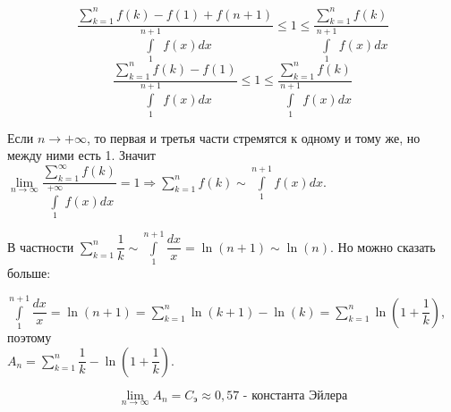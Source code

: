 \documentclass[../main.tex]{subfiles}
\begin{document}
\begin{example}
    \[\dfrac{ \sum\limits_{k=1}^{n}f\left(k\right)-f\left(1\right)+f\left(n+1\right)}{ \displaystyle\int\limits_{ 1}^{ n+1} f\left( x\right)dx} \leq 1 \leq \dfrac{ \sum\limits_{k=1}^{n}f\left(k\right)}{ \displaystyle\int\limits_{ 1}^{ n+1} f\left( x\right)dx} \]
    \[\dfrac{ \sum\limits_{k=1}^{n}f\left(k\right)-f\left(1\right)}{ \displaystyle\int\limits_{ 1}^{ n+1} f\left( x\right)dx} \leq 1 \leq \dfrac{ \sum\limits_{k=1}^{n}f\left(k\right)}{ \displaystyle\int\limits_{ 1}^{ n+1} f\left( x\right)dx} \]
  

    Если \( n \longrightarrow + \infty \), то первая и третья части стремятся к одному и тому же, но между ними есть 1. Значит \( \lim\limits_{ n \rightarrow \infty } \dfrac{ \sum\limits_{k=1}^{\infty}f\left(k\right)}{ \displaystyle\int\limits_{ 1}^{ + \infty } f\left( x\right)dx}=1 \Longrightarrow \sum\limits_{ k=1}^{ n } f\left( k\right) \sim \displaystyle\int\limits_{ 1}^{ n+1 } f\left( x\right)dx\).

    В частности \( \sum\limits_{ k=1}^{ n} \dfrac{ 1}{ k} \sim \displaystyle\int\limits_{ 1}^{ n+1} \dfrac{ dx}{ x} = \ln \left( n+1\right) \sim \ln \left( n\right)\). Но можно сказать больше:

    \( \displaystyle\int\limits_{ 1}^{ n+1} \dfrac{ dx}{ x} = \ln \left( n+1\right)= \sum\limits_{ k=1}^{ n} \ln \left( k+1\right) - \ln \left( k\right)= \sum\limits_{ k=1}^{ n} \ln \left( 1+ \dfrac{ 1}{ k} \right)\), поэтому \\\( A_n= \sum\limits_{ k=1}^{ n} \dfrac{ 1}{ k} - \ln \left( 1+ \dfrac{ 1}{ k} \right)\).

    \[ \boxed{ \lim\limits_{ n \rightarrow \infty } A_n=C_{\textrm{э}} \approx 0,57} \text{ - константа Эйлера}\]
\end{example}
\end{document}
